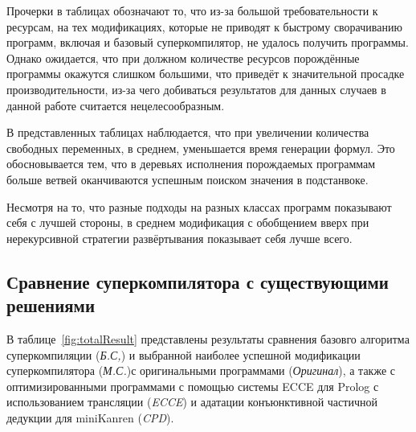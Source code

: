 Прочерки в таблицах обозначают то, что из-за большой требовательности к ресурсам,
на тех модификациях, которые не приводят к быстрому сворачиванию программ,
включая и базовый суперкомпилятор, не удалось получить программы. Однако ожидается,
что при должном количестве ресурсов порождённые программы окажутся слишком большими,
что приведёт к значительной просадке производительности, из-за чего добиваться результатов
для данных случаев в данной работе считается нецелесообразным.

В представленных таблицах наблюдается, что при увеличении количества свободных переменных,
в среднем, уменьшается время генерации формул. Это обосновывается тем, что в
деревьях исполнения порождаемых программам больше ветвей оканчиваются успешным
поиском значения в подстанвоке.



Несмотря на то, что разные подходы на разных классах программ показывают
себя с лучшей стороны, в среднем модификация с обобщением вверх при
нерекурсивной стратегии развёртывания показывает себя лучше всего.

\subsection{Сравнение суперкомпилятора с существующими решениями}

В таблице~\ref{fig:totalResult} представлены результаты сравнения базовго алгоритма
суперкомпиляции ({\it Б.С,}) и выбранной наиболее успешной модификации
суперкомпилятора ({\it М.С.})с оригинальными программами ({\it Оригинал}),
а также с оптимизированными программами с помощью
системы ECCE для Prolog с использованием трансляции ({\it ECCE}) и адатации
конъюнктивной частичной дедукции для miniKanren ({\it CPD}).

